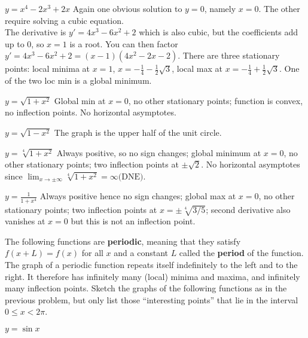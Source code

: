 \begin{multicols}{2}
\problem $\displaystyle y=x^4-2x^3+2x$ %
\answer %
Again one obvious solution to $y=0$, namely $x=0$.  The other
require solving a cubic equation.\\ The derivative is
$y'=4x^3-6x^2+2$ which is also cubic, but the coefficients add up to
0, so $x=1$ is a root.  You can then factor
$y'=4x^3-6x^2+2=(x-1)(4x^2-2x-2)$.  There are three stationary
points: local minima at $x=1$, $x=-\frac14 - \frac12\surd3$, local
max at $x=-\frac14 + \frac12\surd3$.  One of the two loc min is a
global minimum.
\endanswer




\problem $\displaystyle y=\sqrt{1+x^2}$ %
\answer %
Global min at $x=0$, no other stationary points;  function is
convex, no inflection points.  No horizontal asymptotes.
\endanswer




\problem $\displaystyle y=\sqrt{1-x^2}$ %
\answer %
The graph is the upper half of the unit circle.
\endanswer




\problem $\displaystyle y=\sqrt[4]{1+x^2}$ %
\answer %
Always positive, so no sign changes;  global minimum at $x=0$, no
other stationary points; two inflection points at $\pm\surd2$.  No
horizontal asymptotes since $\lim_{x\to\pm\infty} \sqrt[4]{1+x^2} =
\infty \textrm{(DNE)}$.
\endanswer




\problem $\displaystyle y=\frac1{1+x^4} $ %
\answer %
Always positive hence no sign changes; global max at $x=0$, no other
stationary points;  two inflection points at $x=\pm\sqrt[4]{3/5}$;
second derivative also vanishes at $x=0$ but this is not an
inflection point.
\endanswer








\bigskip
\noindent%
The following functions are \textbf{periodic}, meaning that they satisfy $f(x+L)=f(x)$ for
  all $x$ and a constant $L$ called the \textbf{period} of the function.  The
graph of a periodic function repeats itself indefinitely to the left and to
the right.  It therefore has infinitely many (local) minima and maxima, and
infinitely many inflection points.  Sketch the graphs of the following
functions as in the previous problem, but only list those ``interesting
points'' that lie in the interval $0\leq x<2\pi$.




\problem $\displaystyle y=\sin x$ %





\end{multicols}
